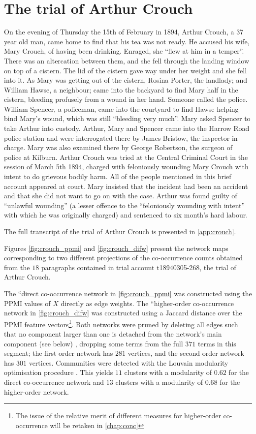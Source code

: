 \section{The trial of Arthur Crouch}
\label{sec:crouch_net}

On the evening of Thursday the 15th of February in 1894, Arthur Crouch, a 37 year old man, came home to find that his tea was not ready.
He accused his wife, Mary Crouch, of having been drinking.
Enraged, she ``flew at him in a temper''.
There was an altercation between them, and she fell through the landing window on top of a cistern.
The lid of the cistern gave way under her weight and she fell into it.
As Mary was getting out of the cistern, Rosina Porter, the landlady; and William Hawse, a neighbour; came into the backyard to find Mary half in the cistern, bleeding profusely from a wound in her hand.
Someone called the police.
William Spencer, a policeman, came into the courtyard to find Hawse helping bind Mary's wound, which was still ``bleeding very much''.
Mary asked Spencer to take Arthur into custody.
Arthur, Mary and Spencer came into the Harrow Road police station and were interrogated there by James Bristow, the inspector in charge.
Mary was also examined there by George Robertson, the surgeon of police at Kilburn.
Arthur Crouch was tried at the Central Criminal Court in the session of March 5th 1894, charged with feloniously wounding Mary Crouch with intent to do grievous bodily harm.
All of the people mentioned in this brief account appeared at court.
Mary insisted that the incident had been an accident and that she did not want to go on with the case.
Arthur was found guilty of ``unlawful wounding'' (a lesser offence to the ``feloniously wounding with intent'' with which he was originally charged) and sentenced to six month's hard labour.

The full transcript of the trial of Arthur Crouch is presented in \autoref{app:crouch}.

Figures \ref{fig:crouch_ppmi} and \ref{fig:crouch_difw} present the network maps corresponding to two different projections of the co-occurrence counts obtained from the $18$ paragraphs contained in trial account t18940305-268, the trial of Arthur Crouch.

The ``direct co-occurrence network in \autoref{fig:crouch_ppmi} was constructed using the PPMI values of $X$ directly as edge weights.
The ``higher-order co-occurrence network in \autoref{fig:crouch_difw} was constructed using a Jaccard distance over the PPMI feature vectors\footnote{
    The issue of the relative merit of different measures for higher-order co-occurrence will be retaken in \autoref{chap:conc}
}.
Both networks were pruned by deleting all edges such that no component larger than one is detached from the network's main component (see below) \citep{zhou2012}, dropping some terms from the full $371$ terms in this segment; the first order network has $281$ vertices, and the second order network has $301$ vertices.
Communities were detected with the Louvain modularity optimisation procedure \citep{blondel2008}.
This yields $11$ clusters with a modularity of $0.62$ for the direct co-occurrence network and $13$ clusters with a modularity of $0.68$ for the higher-order network.

